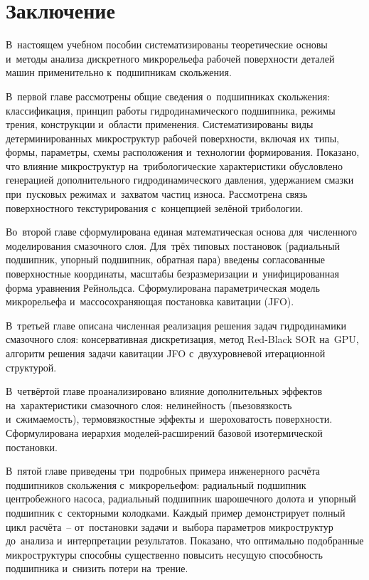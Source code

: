 \chapter*{Заключение}

В~настоящем учебном пособии систематизированы теоретические основы и~методы анализа дискретного микрорельефа рабочей поверхности деталей машин применительно к~подшипникам скольжения.

В~первой главе рассмотрены общие сведения о~подшипниках скольжения: классификация, принцип работы гидродинамического подшипника, режимы трения, конструкции и~области применения. Систематизированы виды детерминированных микроструктур рабочей поверхности, включая их~типы, формы, параметры, схемы расположения и~технологии формирования. Показано, что влияние микроструктур на~трибологические характеристики обусловлено генерацией дополнительного гидродинамического давления, удержанием смазки при~пусковых режимах и~захватом частиц износа. Рассмотрена связь поверхностного текстурирования с~концепцией зелёной трибологии.

Во~второй главе сформулирована единая математическая основа для~численного моделирования смазочного слоя. Для~трёх типовых постановок (радиальный подшипник, упорный подшипник, обратная пара) введены согласованные поверхностные координаты, масштабы безразмеризации и~унифицированная форма уравнения Рейнольдса. Сформулирована параметрическая модель микрорельефа и~массосохраняющая постановка кавитации (JFO).

В~третьей главе описана численная реализация решения задач гидродинамики смазочного слоя: консервативная дискретизация, метод Red-Black SOR на~GPU, алгоритм решения задачи кавитации JFO с~двухуровневой итерационной структурой.

В~четвёртой главе проанализировано влияние дополнительных эффектов на~характеристики смазочного слоя: нелинейность (пьезовязкость и~сжимаемость), термовязкостные эффекты и~шероховатость поверхности. Сформулирована иерархия моделей-расширений базовой изотермической постановки.

В~пятой главе приведены три~подробных примера инженерного расчёта подшипников скольжения с~микрорельефом: радиальный подшипник центробежного насоса, радиальный подшипник шарошечного долота и~упорный подшипник с~секторными колодками. Каждый пример демонстрирует полный цикл расчёта~-- от~постановки задачи и~выбора параметров микроструктур до~анализа и~интерпретации результатов. Показано, что оптимально подобранные микроструктуры способны существенно повысить несущую способность подшипника и~снизить потери на~трение.

